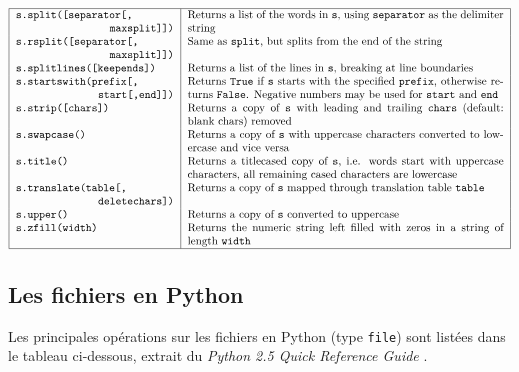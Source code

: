 $$\begin{tabular}{|p{5cm}|p{10cm}|}
\hline
\tt s.split([separator[,\newline
\mbox{}\hfill maxsplit]]) 			& Returns a list of the words in {\tt s}, using {\tt separator} as the delimiter string\\	
\tt s.rsplit([separator[,\newline
\mbox{}\hfill maxsplit]]) 			& Same as {\tt split}, but splits from the end of the string\\
\tt s.splitlines([keepends]) 			& Returns a list of the lines in {\tt s}, breaking at line boundaries\\	
\tt s.startswith(prefix[,\newline
\mbox{}\hfill start[,end]]) 			& Returns {\tt True} if {\tt s} starts with the specified {\tt prefix}, otherwise returns {\tt False}. 
                                                  Negative numbers may be used for {\tt start} and {\tt end}\\	
\tt s.strip([chars]) 				& Returns a copy of {\tt s} with leading and trailing {\tt chars} (default: blank chars) removed\\ 	
\tt s.swapcase() 				& Returns a copy of {\tt s} with uppercase characters converted to lowercase and vice versa\\
\tt s.title() 					& Returns a titlecased copy of {\tt s}, i.e. words start with uppercase characters, all remaining cased characters are lowercase\\ 	
\tt s.translate(table[,\newline
\mbox{}\hfill deletechars]) 			& Returns a copy of {\tt s} mapped through translation table {\tt table}\\ 	
\tt s.upper() 					& Returns a copy of {\tt s} converted to uppercase\\
\tt s.zfill(width) 				& Returns the numeric string left filled with zeros in a string of length {\tt width}\\ 	 
\hline
\end{tabular}$$ 


\subsection{Les fichiers en {\sc Python}}\label{python:fichiers}
Les principales opérations sur les fichiers en {\sc Python} (type {\tt file}) 
sont listées dans le tableau ci-dessous, extrait 
du {\em {\sc Python} 2.5 Quick Reference Guide} \cite{gruet}.

